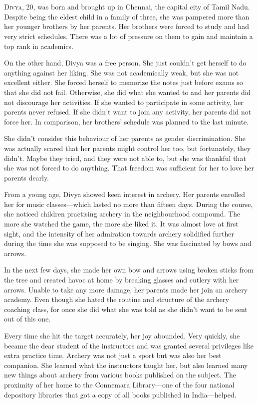 \chapter{}

\lettrine{D}{ivya}, 20, was born and brought up in Chennai, the capital city of Tamil Nadu.
Despite being the eldest child in a family of three, she was pampered more than
her younger brothers by her parents. Her brothers were forced to study and had
very strict schedules. There was a lot of pressure on them to gain and maintain a
top rank in academics.

On the other hand, Divya was a free person. She just couldn't get herself to do
anything against her liking. She was not academically weak, but she was not
excellent either. She forced herself to memorize the notes just before exams so
that she did not fail. Otherwise, she did what she wanted to and her parents did
not discourage her activities. If she wanted to participate in some activity,
her parents never refused. If she didn't want to join any activity, her parents
did not force her. In comparison, her brothers' schedule was planned to the last
minute.

She didn't consider this behaviour of her parents as gender discrimination. She
was actually scared that her parents might control her too, but fortunately,
they didn't. Maybe they tried, and they were not able to, but she was thankful
that she was not forced to do anything. That freedom was sufficient for her to
love her parents dearly.

From a young age, Divya showed keen interest in archery. Her parents enrolled
her for music classes—which lasted no more than fifteen days. During the
course, she noticed children practising archery in the neighbourhood compound.
The more she watched the game, the more she liked it. It was almost love at
first sight, and the intensity of her admiration towards archery solidified
further during the time she was supposed to be singing. She was fascinated by
bows and arrows.

In the next few days, she made her own bow and arrows using broken sticks from
the tree and created havoc at home by breaking glasses and cutlery with her
arrows. Unable to take any more damage, her parents made her join an archery
academy. Even though she hated the routine and structure of the archery coaching
class, for once she did what she was told as she didn't want to be sent out of
this one.

Every time she hit the target accurately, her joy abounded. Very quickly, she
became the dear student of the instructors and was granted several privileges
like extra practice time. Archery was not just a sport but was also her best
companion. She learned what the instructors taught her, but also learned many
new things about archery from various books published on the subject. The
proximity of her home to the Connemara Library—one of the four national
depository libraries that got a copy of all books published in India—helped.

